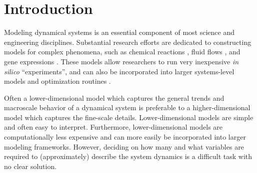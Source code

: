 

\chapter{Introduction\label{ch:intro}}

Modeling dynamical systems is an essential component of most science and engineering disciplines.
%
Substantial research efforts are dedicated to constructing models for complex phenomena, such as chemical reactions \cite{dong2007simplification, gillespie1977exact, gallagher1986combined}, fluid flows \cite{anderson1995computational}, and gene expressions \cite{bar2004analyzing, storey2005significance}.
%
These models allow researchers to run very inexpensive {\em in silico} ``experiments'', and can also be incorporated into larger systems-level models and optimization routines \cite{daoutidis2013engineering, oluwole2006rigorous, rubert2014advanced}.

Often a lower-dimensional model which captures the general trends and macroscale behavior of a dynamical system is preferable to a higher-dimensional model which captures the fine-scale details.
%
Lower-dimensional models are simple and often easy to interpret.
%
Furthermore, lower-dimensional models are computationally less expensive and can more easily be incorporated into larger modeling frameworks.
%
However, deciding on how many and what variables are required to (approximately) describe the system dynamics is a difficult task with no clear solution.





